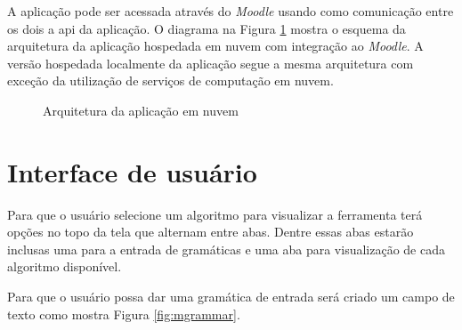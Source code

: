 A aplicação pode ser acessada através do \textit{Moodle} usando como comunicação entre os dois a \gls{api} da aplicação. O diagrama na Figura \ref{fig:arqremo} mostra o esquema da arquitetura da aplicação hospedada em nuvem com integração ao \textit{Moodle}. A versão hospedada localmente da aplicação segue a mesma arquitetura com exceção da utilização de serviços de computação em nuvem.

\begin{figure}[ht]
  \centering
  \captionsetup{width=16cm}
  \caption{Arquitetura da aplicação em nuvem}
  \label{fig:arqremo}
\end{figure}
\FloatBarrier

\section{Interface de usuário}
Para que o usuário selecione um algoritmo para visualizar a ferramenta terá opções no topo da tela que alternam entre abas. Dentre essas abas estarão inclusas uma para a entrada de gramáticas e uma aba para visualização de cada algoritmo disponível.

Para que o usuário possa dar uma gramática de entrada será criado um campo de texto como mostra Figura \ref{fig:mgrammar}.

